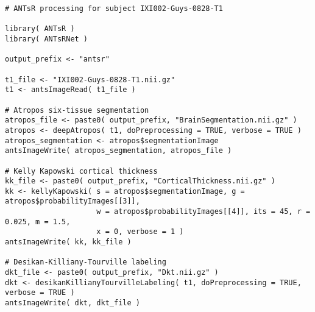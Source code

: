\begin{lstlisting}
# ANTsR processing for subject IXI002-Guys-0828-T1

library( ANTsR )
library( ANTsRNet )

output_prefix <- "antsr"

t1_file <- "IXI002-Guys-0828-T1.nii.gz"
t1 <- antsImageRead( t1_file )

# Atropos six-tissue segmentation
atropos_file <- paste0( output_prefix, "BrainSegmentation.nii.gz" )
atropos <- deepAtropos( t1, doPreprocessing = TRUE, verbose = TRUE )
atropos_segmentation <- atropos$segmentationImage
antsImageWrite( atropos_segmentation, atropos_file )

# Kelly Kapowski cortical thickness
kk_file <- paste0( output_prefix, "CorticalThickness.nii.gz" )
kk <- kellyKapowski( s = atropos$segmentationImage, g = atropos$probabilityImages[[3]],
                     w = atropos$probabilityImages[[4]], its = 45, r = 0.025, m = 1.5,
                     x = 0, verbose = 1 )
antsImageWrite( kk, kk_file )

# Desikan-Killiany-Tourville labeling
dkt_file <- paste0( output_prefix, "Dkt.nii.gz" )
dkt <- desikanKillianyTourvilleLabeling( t1, doPreprocessing = TRUE, verbose = TRUE )
antsImageWrite( dkt, dkt_file )
\end{lstlisting}




